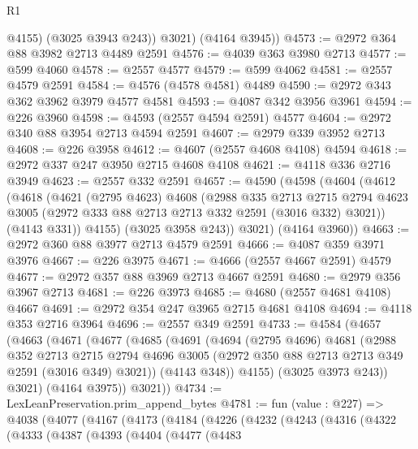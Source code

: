\begin{lexlean}{R1}
\begin{coremodule}
            @4155)
          (@3025 @3943 @243))
        @3021)
      (@4164 @3945))
@4573 := @2972 @364 @88 @3982 @2713 @4489 @2591
@4576 := @4039 @363 @3980 @2713
@4577 := @599 @4060
@4578 := @2557 @4577
@4579 := @599 @4062
@4581 := @2557 @4579 @2591
@4584 := @4576 (@4578 @4581) @4489
@4590 := @2972 @343 @362 @3962 @3979 @4577 @4581
@4593 := @4087 @342 @3956 @3961
@4594 := @226 @3960
@4598 := @4593 (@2557 @4594 @2591) @4577
@4604 := @2972 @340 @88 @3954 @2713 @4594 @2591
@4607 := @2979 @339 @3952 @2713
@4608 := @226 @3958
@4612 := @4607 (@2557 @4608 @4108) @4594
@4618 := @2972 @337 @247 @3950 @2715 @4608 @4108
@4621 := @4118 @336 @2716 @3949
@4623 := @2557 @332 @2591
@4657 := @4590
    (@4598
      (@4604
        (@4612
          (@4618
            (@4621
              (@2795 @4623)
              @4608
              (@2988
                @335
                @2713
                @2715
                @2794
                @4623
                @3005
                (@2972 @333 @88 @2713 @2713 @332 @2591 (@3016 @332) @3021))
              (@4143 @331))
            @4155)
          (@3025 @3958 @243))
        @3021)
      (@4164 @3960))
@4663 := @2972 @360 @88 @3977 @2713 @4579 @2591
@4666 := @4087 @359 @3971 @3976
@4667 := @226 @3975
@4671 := @4666 (@2557 @4667 @2591) @4579
@4677 := @2972 @357 @88 @3969 @2713 @4667 @2591
@4680 := @2979 @356 @3967 @2713
@4681 := @226 @3973
@4685 := @4680 (@2557 @4681 @4108) @4667
@4691 := @2972 @354 @247 @3965 @2715 @4681 @4108
@4694 := @4118 @353 @2716 @3964
@4696 := @2557 @349 @2591
@4733 := @4584
    (@4657
      (@4663
        (@4671
          (@4677
            (@4685
              (@4691
                (@4694
                  (@2795 @4696)
                  @4681
                  (@2988
                    @352
                    @2713
                    @2715
                    @2794
                    @4696
                    @3005
                    (@2972 @350 @88 @2713 @2713 @349 @2591 (@3016 @349) @3021))
                  (@4143 @348))
                @4155)
              (@3025 @3973 @243))
            @3021)
          (@4164 @3975))
        @3021))
@4734 := LexLeanPreservation.prim_append_bytes
@4781 := fun (value : @227) =>
  @4038
    (@4077
      (@4167
        (@4173
          (@4184
            (@4226
              (@4232
                (@4243
                  (@4316
                    (@4322
                      (@4333
                        (@4387
                          (@4393
                            (@4404
                              (@4477
                                (@4483

\end{coremodule}
\end{lexlean}
